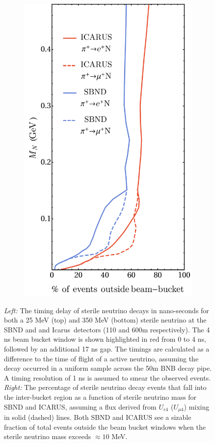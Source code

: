 \documentclass[11pt, a4paper]{article}
\def\icarus{Icarus}
\begin{document}
\begin{figure}[t]
\begin{subfigure}[c]{0.32\textwidth}
\includegraphics[width=\textwidth]{figures/line_plots_long.pdf} \end{subfigure}
\caption{\label{fig:timing} \emph{Left:} The timing delay of sterile neutrino
decays in nano-seconds for both a 25 MeV (top) and 350 MeV (bottom) sterile
neutrino at the SBND and and \icarus\ detectors (110 and 600m respectively).
The 4 ns beam bucket window is shown highlighted in red from 0 to 4 ns,
followed by an additional 17 ns gap. The timings are calculated as a difference
to the time of flight of a active neutrino, assuming the decay occurred in a
uniform sample across the 50m BNB decay pipe. A timing resolution of 1 ns is
assumed to smear the observed events. \emph{Right:} The percentage of sterile neutrino
decay events that fall into the inter-bucket region as a function of sterile neutrino
mass for SBND and ICARUS, assuming a flux derived from $U_{e4}$ ($U_{\mu 4}$)
mixing in solid (dashed) lines. Both SBND and ICARUS see a sizable fraction of
total events outside the beam bucket windows when the sterile neutrino mass exceeds
$\approx10$ MeV.  }

\end{figure}
\end{document}
